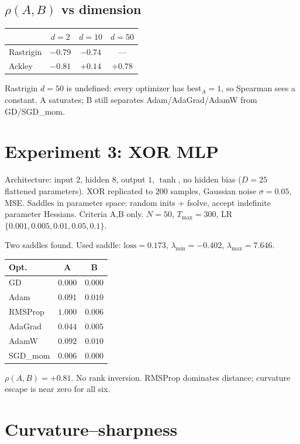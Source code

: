 \documentclass[11pt]{article}
\begin{document}
\subsection{$\rho(A,B)$ vs dimension}

\begin{center}
\begin{tabular}{lccc}
\toprule
 & $d=2$ & $d=10$ & $d=50$ \\
\midrule
Rastrigin & $-0.79$ & $-0.74$ & --- \\
Ackley    & $-0.81$ & $+0.14$ & $+0.78$ \\
\bottomrule
\end{tabular}
\end{center}
Rastrigin $d=50$ is undefined: every optimizer has $\mathrm{best}_A=1$, so
Spearman sees a constant. A saturates; B still separates
Adam/AdaGrad/AdamW from GD/SGD\_mom.

\section{Experiment 3: XOR MLP}

Architecture: input $2$, hidden $8$, output $1$, $\tanh$, no hidden bias
($D=25$ flattened parameters). XOR replicated to $200$ samples, Gaussian
noise $\sigma=0.05$, MSE. Saddles in parameter space: random inits + fsolve,
accept indefinite parameter Hessians. Criteria A,B only. $N=50$,
$T_{\max}=300$, LR $\{0.001,0.005,0.01,0.05,0.1\}$.

Two saddles found. Used saddle: $\mathrm{loss}=0.173$,
$\lambda_{\min}=-0.402$, $\lambda_{\max}=7.646$.

\begin{center}
\begin{tabular}{lcc}
\toprule
Opt. & A & B \\
\midrule
GD      & $0.000$ & $0.000$ \\
Adam    & $0.091$ & $0.010$ \\
RMSProp & $1.000$ & $0.006$ \\
AdaGrad & $0.044$ & $0.005$ \\
AdamW   & $0.092$ & $0.010$ \\
SGD\_mom& $0.006$ & $0.000$ \\
\bottomrule
\end{tabular}
\end{center}
$\rho(A,B)=+0.81$. No rank inversion. RMSProp dominates distance; curvature
escape is near zero for all six.

\section{Curvature--sharpness}
\end{document}
